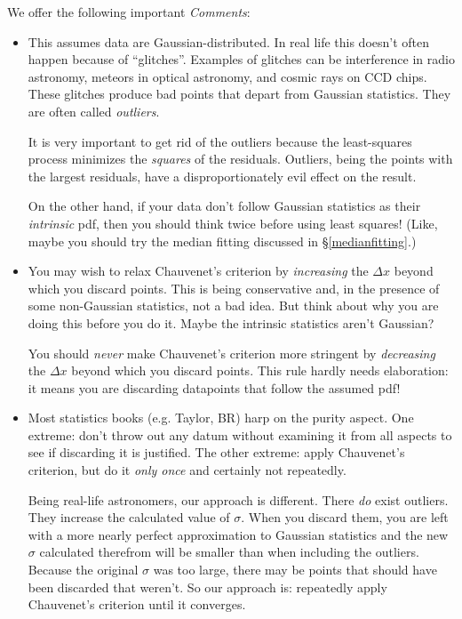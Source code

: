 \documentclass[psfig,preprint]{aastex}
\begin{document}
	We offer the following important {\it Comments}:
\begin{itemize}

	\item This assumes data are Gaussian-distributed. In real life
this doesn't often happen because of ``glitches''. Examples of glitches
can be interference in radio astronomy, meteors in optical astronomy,
and cosmic rays on CCD chips. These glitches produce bad points that
depart from Gaussian statistics. They are often called {\it outliers}.

	It is very important to get rid of the outliers because the
least-squares process minimizes the {\it squares} of the residuals.
Outliers, being the points with the largest residuals, have a
disproportionately evil effect on the result.

	On the other hand, if your data don't follow Gaussian statistics
as their {\it intrinsic} pdf, then you should think twice before using
least squares! (Like, maybe you should try the median fitting discussed in
\S \ref{medianfitting}.)

	\item You may wish to relax Chauvenet's criterion by {\it
increasing} the $\Delta x$ beyond which you discard points. This is
being conservative and, in the presence of some non-Gaussian statistics,
not a bad idea. But think about why you are doing this before you do it.
Maybe the intrinsic statistics aren't Gaussian?

	You should {\it never} make Chauvenet's criterion more stringent
by {\it decreasing} the $\Delta x$ beyond which you discard points. This
rule hardly needs elaboration: it means you are discarding datapoints
that follow the assumed pdf!

	\item Most statistics books (e.g. Taylor, BR) harp on the purity
aspect. One extreme: don't throw out any datum without examining it from all
aspects to see if discarding it is justified. The other extreme: apply
Chauvenet's criterion, but do it {\it only once} and certainly not
repeatedly.

	Being real-life astronomers, our approach is different. There
{\it do} exist outliers. They increase the calculated value of $\sigma$.
When you discard them, you are left with a more nearly perfect
approximation to Gaussian statistics and the new $\sigma$ calculated
therefrom will be smaller than when including the outliers. Because the
original $\sigma$ was too large, there may be points that should have
been discarded that weren't. So our approach is: repeatedly apply
Chauvenet's criterion until it converges. 


\end{itemize}
\end{document}
